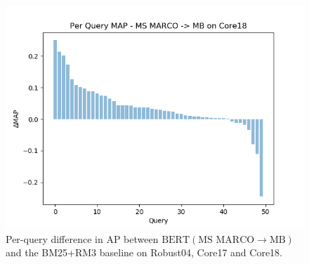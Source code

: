 \begin{figure}[t!]
\begin{minipage}{0.33\textwidth}
        \includegraphics[width=\textwidth]{figures/perquery3.png}
    \end{minipage}
\caption{Per-query difference in AP between $ \textrm{BERT}(\textrm{MS MARCO}\rightarrow\textrm{MB}) $ and the BM25+RM3 baseline on Robust04, Core17 and Core18.}
\label{fig:perquery-msmarcomb}
\end{figure}

